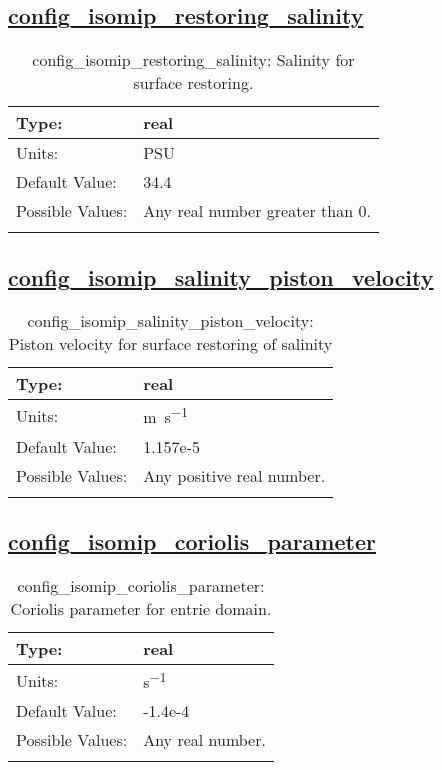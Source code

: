 \subsection[config\_isomip\_restoring\_salinity]{\hyperref[sec:nm_tab_isomip]{config\_isomip\_restoring\_salinity}}
\label{subsec:nm_sec_config_isomip_restoring_salinity}
\begin{center}
\begin{longtable}{| p{2.0in} || p{4.0in} |}
    \hline
    Type: & real \\
    \hline
    Units: & \si{PSU} \\
    \hline
    Default Value: & 34.4 \\
    \hline
    Possible Values: & Any real number greater than 0. \\
    \hline
    \caption{config\_isomip\_restoring\_salinity: Salinity for surface restoring.}
\end{longtable}
\end{center}
\subsection[config\_isomip\_salinity\_piston\_velocity]{\hyperref[sec:nm_tab_isomip]{config\_isomip\_salinity\_piston\_velocity}}
\label{subsec:nm_sec_config_isomip_salinity_piston_velocity}
\begin{center}
\begin{longtable}{| p{2.0in} || p{4.0in} |}
    \hline
    Type: & real \\
    \hline
    Units: & \si{m.s^{-1}} \\
    \hline
    Default Value: & 1.157e-5 \\
    \hline
    Possible Values: & Any positive real number. \\
    \hline
    \caption{config\_isomip\_salinity\_piston\_velocity: Piston velocity for surface restoring of salinity}
\end{longtable}
\end{center}
\subsection[config\_isomip\_coriolis\_parameter]{\hyperref[sec:nm_tab_isomip]{config\_isomip\_coriolis\_parameter}}
\label{subsec:nm_sec_config_isomip_coriolis_parameter}
\begin{center}
\begin{longtable}{| p{2.0in} || p{4.0in} |}
    \hline
    Type: & real \\
    \hline
    Units: & \si{s^{-1}} \\
    \hline
    Default Value: & -1.4e-4 \\
    \hline
    Possible Values: & Any real number. \\
    \hline
    \caption{config\_isomip\_coriolis\_parameter: Coriolis parameter for entrie domain.}
\end{longtable}
\end{center}
